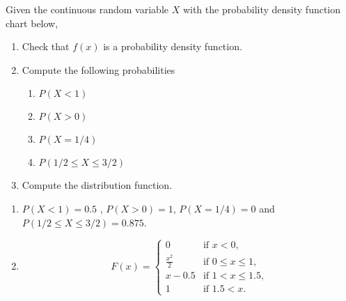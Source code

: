 {Given the continuous random variable $X$ with the probability density function chart below,
\begin{center}
\scalebox{0.7}{}
\end{center}
\begin{enumerate}
\item Check that $f(x)$ is a probability density function.
\item Compute the following probabilities
\begin{enumerate}
\item $P(X<1)$
\item $P(X>0)$
\item $P(X=1/4)$
\item $P(1/2\leq X\leq 3/2)$
\end{enumerate}
\item Compute the distribution function.
\end{enumerate}
}
{
\begin{enumerate}[start=2]
\item $P(X<1)=0.5$ , $P(X>0)=1$, $P(X=1/4)=0$ and $P(1/2\leq X\leq 3/2)=0.875$.
\item \[
F(x)=
\begin{cases}
0 & \mbox{if $x<0$,}\\
\frac{x^2}{2} & \mbox{if $0\leq x\leq 1$,}\\
x-0.5 & \mbox{if $1<x\leq 1.5$,}\\
1 & \mbox{if $1.5<x$.}
\end{cases}
\]
\end{enumerate}
}
{}



